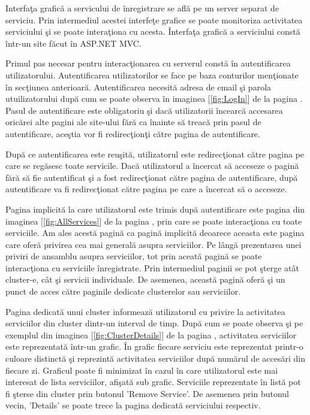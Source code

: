 \documentclass[a4paper,12pt]{report}
\let\oldref\ref
\renewcommand{\ref}[1]{[\oldref{#1}]}
\begin{document}
Interfa\c ta grafic\u a a servicului de \^inregistrare se afl\u a pe un server separat de serviciu.
Prin intermediul acestei interfe\c te grafice se poate monitoriza activitatea serviciului \c si se poate intera\c tiona 
cu acesta. \^Interfa\c ta grafic\u a a serviciului const\u a \^intr-un site f\u acut \^in ASP.NET MVC. 

Primul pas 
necesar pentru interac\c tionarea cu serverul const\u a \^in autentificarea utilizatorului. Autentificarea utilizatorilor 
se face pe baza conturilor men\c tionate \^in sec\c tiunea anterioar\u a. Autentificarea necesit\u a adresa de email 
\c si parola utuilizatorului dup\u a cum se poate observa \^in imaginea \ref{fig:LogIn} de la pagina \pageref{fig:LogIn}.  
Pasul de autentificare este obligatoriu \c si dac\u a utilizatorii \^incearc\u a accesarea oric\u arei alte pagini ale 
site-ului f\u ar\u a ca \^inainte s\u a treac\u a prin pasul de autentificare, ace\c stia vor fi redirec\c tion\c ti 
c\u atre pagina de autentificare.

Dup\u a ce autentificarea este reu\c sit\u a, utilizatorul este redirec\c tionat c\u atre pagina pe care se reg\u asesc toate 
servicile. Dac\u a utilizatorul a \^incercat s\u a acceseze o pagin\u a f\u ar\u a s\u a fie autentificat \c si a fost redirec\c tionat
c\u atre pagina de autentificare, dup\u a autentificare va fi redirec\c tionat c\u atre pagina pe care a \^incercat s\u a
o acceseze.

Pagina implicit\u a la care utilizatorul este trimis dup\u a autentificare este pagina din imaginea \ref{fig:AllServices} de la 
pagina \pageref{fig:AllServices}, prin care se poate interac\c tiona cu toate serviciile. Am ales acest\u a pagin\u a ca pagin\u a implicit\u a
deoarece aceasta este pagina care ofer\u a privirea cea mai general\u a asupra serviciilor. Pe l\^ang\u a prezentarea unei priviri de ansamblu 
asupra serviciilor, tot prin aceat\u a pagin\u a se poate interac\c tiona cu serviciile \^inregistrate. Prin intermediul paginii
se pot \c sterge at\^at cluster-e, c\^at \c si servicii individuale. De asemenea, aceast\u a pagin\u a ofer\u a \c si un punct de 
acces c\u atre paginile dedicate clusterelor sau serviciilor.

Pagina dedicat\u a unui cluster informeaz\u a utilizatorul cu privire la activitatea serviciilor din cluster dintr-un interval de timp.
Dup\u a cum se poate observa \c si pe exemplul din imaginea \ref{fig:ClusterDetails} de la pagina \pageref{fig:ClusterDetails},
activitatea serviciilor este reprezentat\u a \^intr-un grafic. \^In grafic fiecare serviciu este reprezentat printr-o
culoare distinct\u a \c si reprezint\u a activitatea serviciilor dup\u a num\u arul de acces\u ari din fiecare zi.
Graficul poate fi minimizat \^in cazul \^in care utilizatorul este mai interesat de lista serviciilor, afi\c sat\u a 
sub grafic. Serviciile reprezentate \^in list\u a pot fi \c sterse din cluster prin butonul 'Remove Service'. De asemenea 
prin butonul vecin, 'Details' se poate trece la pagina dedicat\u a serviciului respectiv. 
\end{document}
